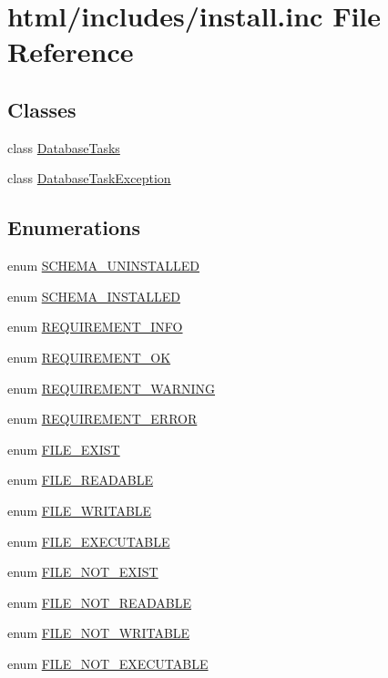 \hypertarget{install_8inc}{
\section{html/includes/install.inc File Reference}
\label{install_8inc}
}
\subsection*{Classes}
\begin{DoxyCompactItemize}
\item 
class \hyperlink{classDatabaseTasks}{DatabaseTasks}
\item 
class \hyperlink{classDatabaseTaskException}{DatabaseTaskException}
\end{DoxyCompactItemize}
\subsection*{Enumerations}
\begin{DoxyCompactItemize}
\item 
enum \hyperlink{install_8inc_ab2f11b038ed6a537bfdd257be863075f}{SCHEMA\_\-UNINSTALLED} 
\item 
enum \hyperlink{install_8inc_aaa1b441be0b54ef62f6ea8d391f9cc99}{SCHEMA\_\-INSTALLED} 
\item 
enum \hyperlink{install_8inc_ab679de0810b6a879525b822fa33e3d75}{REQUIREMENT\_\-INFO} 
\item 
enum \hyperlink{install_8inc_add48d60abb0dc390c50bf824f1751cc2}{REQUIREMENT\_\-OK} 
\item 
enum \hyperlink{install_8inc_a2879fcef075548b2dceeeaa9571dcf8d}{REQUIREMENT\_\-WARNING} 
\item 
enum \hyperlink{install_8inc_aeddf02286107904721cb582bd430581d}{REQUIREMENT\_\-ERROR} 
\item 
enum \hyperlink{install_8inc_ae627ec3bb64949659adbc8cac5ae063e}{FILE\_\-EXIST} 
\item 
enum \hyperlink{install_8inc_a5a3ab6bb8b0df419dff1d9c741e5ca56}{FILE\_\-READABLE} 
\item 
enum \hyperlink{install_8inc_a18edb581d332bd2fe379104a39e3b1a2}{FILE\_\-WRITABLE} 
\item 
enum \hyperlink{install_8inc_a03399711a43d84ee8783b8b1214dd429}{FILE\_\-EXECUTABLE} 
\item 
enum \hyperlink{install_8inc_a2d02367d8fd76c70b1ffb77b24e62db9}{FILE\_\-NOT\_\-EXIST} 
\item 
enum \hyperlink{install_8inc_ab09b4a70a73804ec35333d43a878a572}{FILE\_\-NOT\_\-READABLE} 
\item 
enum \hyperlink{install_8inc_a01939e1b55bf40d1ac3556eded13a353}{FILE\_\-NOT\_\-WRITABLE} 
\item 
enum \hyperlink{install_8inc_a3c1acd6083afd2e6d977616f227fcf26}{FILE\_\-NOT\_\-EXECUTABLE} 
\end{DoxyCompactItemize}
